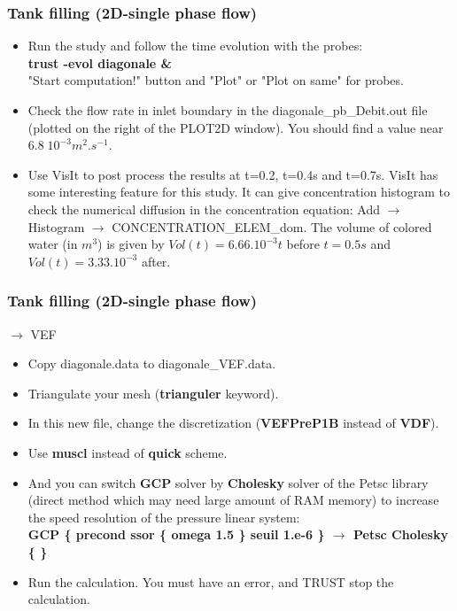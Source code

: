 \documentclass[10pt, hyperref={unicode=true,pdfusetitle, bookmarks=true,bookmarksnumbered=false,bookmarksopen=false, breaklinks=false,pdfborder={0 0 1},backref=true,colorlinks=true,linkcolor=darkblue,pageanchor}]{beamer}
\begin{document}
\begin{frame}
\frametitle{Tank filling (2D-single phase flow)}
\begin{block}{}

\begin{itemize}
\item Run the study and follow the time evolution with the probes:\\
\textbf{trust -evol diagonale \&} \\
"Start computation!" button and "Plot" or "Plot on same" for probes.
\item Check the flow rate in inlet boundary in the diagonale\_pb\_Debit.out file (plotted on the right of the PLOT2D window). You should find a value near $6.8 \; 10^{-3} m^2.s^{-1}$.
\item Use VisIt to post process the results at t=0.2, t=0.4s and t=0.7s. VisIt has some interesting feature for this study. It can give concentration histogram to check the numerical diffusion in the concentration equation: Add $\rightarrow$ Histogram $\rightarrow$ CONCENTRATION\_ELEM\_dom.
The volume of colored water (in $m^3$) is given by $Vol(t)= 6.66.10^{-3} t$ before $t=0.5s$ and $Vol(t)=3.33.10^{-3}$ after.
\end{itemize}

\end{block}
\end{frame}
\begin{frame}
\frametitle{Tank filling (2D-single phase flow)}
\begin{block}{$\rightarrow$ VEF}

\begin{itemize}
\item Copy diagonale.data to diagonale\_VEF.data.
\item Triangulate your mesh (\textbf{trianguler} keyword).
\item In this new file, change the discretization (\textbf{VEFPreP1B} instead of \textbf{VDF}).
\item Use \textbf{muscl} instead of \textbf{quick} scheme.
\item And you can switch \textbf{GCP} solver by \textbf{Cholesky} solver of the Petsc library (direct method which may need large amount of RAM memory) to increase the speed resolution of the pressure linear system:\\
\textbf{GCP \{ precond ssor \{ omega 1.5 \} seuil 1.e-6 \} $\rightarrow$ Petsc Cholesky \{ \}}
\item Run the calculation. You must have an error, and TRUST stop the calculation. 
\end{itemize}

\end{block}
\end{frame}
\end{document}
